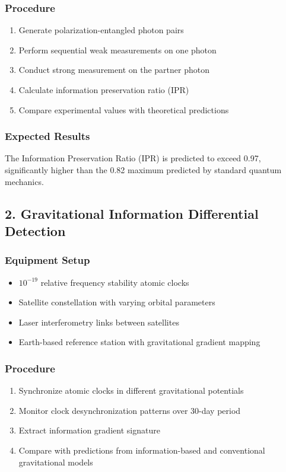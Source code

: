 \documentclass[10pt]{article}
\begin{document}
\subsubsection*{Procedure}
\begin{enumerate}
\item Generate polarization-entangled photon pairs
\item Perform sequential weak measurements on one photon
\item Conduct strong measurement on the partner photon
\item Calculate information preservation ratio (IPR)
\item Compare experimental values with theoretical predictions
\end{enumerate}

\subsubsection*{Expected Results}
The Information Preservation Ratio (IPR) is predicted to exceed 0.97, significantly higher than the 0.82 maximum predicted by standard quantum mechanics.

\subsection*{2. Gravitational Information Differential Detection}

\subsubsection*{Equipment Setup}
\begin{itemize}
\item $10^{-19}$ relative frequency stability atomic clocks
\item Satellite constellation with varying orbital parameters
\item Laser interferometry links between satellites
\item Earth-based reference station with gravitational gradient mapping
\end{itemize}

\subsubsection*{Procedure}
\begin{enumerate}
\item Synchronize atomic clocks in different gravitational potentials
\item Monitor clock desynchronization patterns over 30-day period
\item Extract information gradient signature
\item Compare with predictions from information-based and conventional gravitational models
\end{enumerate}
\end{document}

